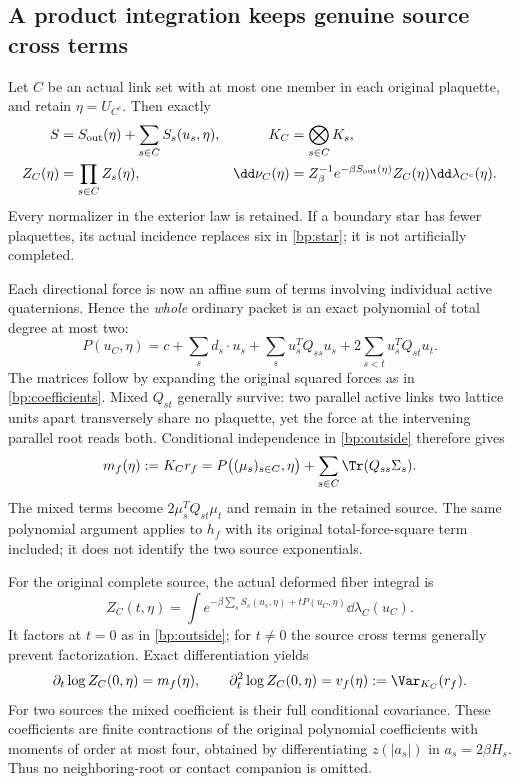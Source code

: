 \subsection{A product integration keeps genuine source cross terms}

Let $C$ be an actual link set with at most one member in each original plaquette, and retain $\eta=U_{C^c}$. Then exactly
\begin{align}
 S&=S_{\rm out}(\eta)+\sum_{s\in C}S_s(u_s,\eta),
 &K_C&=\bigotimes_{s\in C}K_s,\notag\\
 Z_C(\eta)&=\prod_{s\in C}Z_s(\eta),
 &\dd\nu_C(\eta)&=Z_\beta^{-1}e^{-\beta S_{\rm out}(\eta)}Z_C(\eta)
                                  \dd\lambda_{C^c}(\eta).
 \label{bp:outside}
\end{align}
Every normalizer in the exterior law is retained. If a boundary star has fewer plaquettes, its actual incidence replaces six in \eqref{bp:star}; it is not artificially completed.

Each directional force is now an affine sum of terms involving individual active quaternions. Hence the \emph{whole} ordinary packet is an exact polynomial of total degree at most two:
\begin{equation}
 P(u_C,\eta)=c+\sum_s d_s\cdot u_s+\sum_su_s^TQ_{ss}u_s
                         +2\sum_{s<t}u_s^TQ_{st}u_t.
 \label{bp:batchpolynomial}
\end{equation}
The matrices follow by expanding the original squared forces as in \eqref{bp:coefficients}. Mixed $Q_{st}$ generally survive: two parallel active links two lattice units apart transversely share no plaquette, yet the force at the intervening parallel root reads both. Conditional independence in \eqref{bp:outside} therefore gives
\begin{equation}
 m_f(\eta):=K_Cr_f
   =P\bigl((\mu_s)_{s\in C},\eta\bigr)
                  +\sum_{s\in C}\Tr(Q_{ss}\Sigma_s).
 \label{bp:batchmean}
\end{equation}
The mixed terms become $2\mu_s^TQ_{st}\mu_t$ and remain in the retained source. The same polynomial argument applies to $h_f$ with its original total-force-square term included; it does not identify the two source exponentials.

For the original complete source, the actual deformed fiber integral is
\begin{equation}
 Z_C(t,\eta)=\int
 e^{-\beta\sum_sS_s(u_s,\eta)+tP(u_C,\eta)}\dd\lambda_C(u_C).
 \label{bp:sourceintegral}
\end{equation}
It factors at $t=0$ as in \eqref{bp:outside}; for $t\ne0$ the source cross terms generally prevent factorization. Exact differentiation yields
\begin{equation}
 \partial_t\log Z_C(0,\eta)=m_f(\eta),\qquad
 \partial_t^2\log Z_C(0,\eta)=v_f(\eta):=\Var_{K_C}(r_f).
 \label{bp:jets}
\end{equation}
For two sources the mixed coefficient is their full conditional covariance. These coefficients are finite contractions of the original polynomial coefficients with moments of order at most four, obtained by differentiating $z(|a_s|)$ in $a_s=2\beta H_s$. Thus no neighboring-root or contact companion is omitted.

